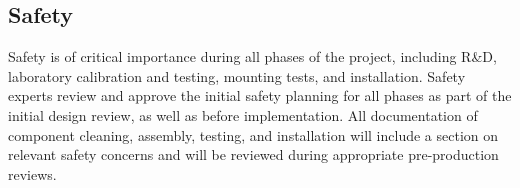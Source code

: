 \subsection{Safety}
Safety %
is of critical importance during %
all phases of the  project, including R\&D, laboratory calibration and testing, mounting tests, and installation. 
Safety experts %
review and approve the initial safety planning for all phases as part of the initial design review, as well as %
before implementation. 
All documentation of component cleaning, assembly, testing, and installation will include a section on relevant safety concerns and will be reviewed during appropriate pre-production reviews.

